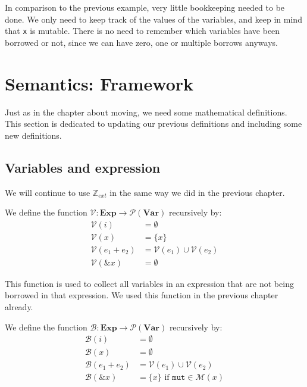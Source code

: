 In comparison to the previous example, very little bookkeeping needed to be done. We only need to keep track of the values of the variables, and keep in mind that \texttt{x} is mutable. There is no need to remember which variables have been borrowed or not, since we can have zero, one or multiple borrows anyways. 

\section{Semantics: Framework}
Just as in the chapter about moving, we need some mathematical definitions. This section is dedicated to updating our previous definitions and including some new definitions. 

\subsection*{Variables and expression}
We will continue to use $\mathbb{Z}_{ext}$ in the same way we did in the previous chapter. 

\begin{definition}
We define the function $\mathcal{V}: \textbf{Exp} \to \mathcal{P}(\textbf{Var})$ recursively by:
\begin{align*}
    \mathcal{V}(i)          &= \emptyset
\\  \mathcal{V}(x)          &= \{ x \}
\\  \mathcal{V}(e_1 + e_2)  &= \mathcal{V}(e_1) \cup \mathcal{V}(e_2)
\\  \mathcal{V}(\& x)       &= \emptyset
\end{align*}
\end{definition}

This function is used to collect all variables in an expression that are not being borrowed in that expression. We used this function in the previous chapter already. 

\begin{definition}
We define the function $\mathcal{B}: \textbf{Exp} \to \mathcal{P}(\textbf{Var})$ recursively by:
\begin{align*}
    \mathcal{B}(i)          &= \emptyset
\\  \mathcal{B}(x)          &= \emptyset
\\  \mathcal{B}(e_1 + e_2)  &= \mathcal{V}(e_1) \cup \mathcal{V}(e_2)
\\  \mathcal{B}(\& x)       &= \{ x \} \textrm{ if } \texttt{mut} \in \mathcal{M}(x) 
\end{align*}
\end{definition}

